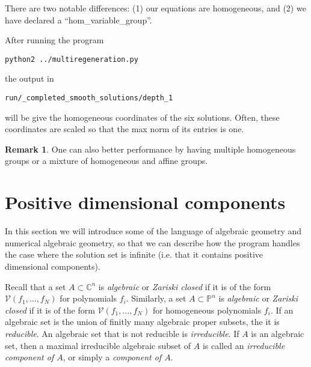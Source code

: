 \documentclass[12pt]{article}
\theoremstyle{definition}
\newtheorem{remark}{Remark}[section]
\newcommand{\C}{\mathbb{C}}
\newcommand{\PP}{\mathbb{P}}
\begin{document}
There are two notable differences: (1) our equations are homogeneous, and 
(2) we have declared a ``hom\_variable\_group''.

 After running the program
\begin{leftbar}
\vspace{-10pt} 
\begin{verbatim}
python2 ../multiregeneration.py
\end{verbatim}\vspace{-10pt} 
\end{leftbar}
\noindent the output in
\begin{leftbar}
\vspace{-10pt} 
\begin{verbatim}
run/_completed_smooth_solutions/depth_1
\end{verbatim}\vspace{-10pt} 
\end{leftbar}
\noindent will be give the homogeneous coordinates of the six 
solutions.
Often, these coordinates are scaled so that the max norm of its entries is one. 

\begin{remark}
One can also better performance by having multiple homogeneous groups or a mixture of homogeneous and affine groups. 
\end{remark}

\section{Positive dimensional components}
In this section we will introduce some of the language of 
algebraic geometry and numerical algebraic geometry, so that we can 
describe how the program handles the case where the solution set is 
infinite (i.e. that it contains positive dimensional components).

Recall that a set $A \subset \C^n$ is \emph{algebraic} or \emph{Zariski 
closed} if it is of the form $\mathcal{V}(f_1, \ldots, f_N)$ for 
polynomials $f_i$. Similarly, a set $A \subset \PP^n$ is 
\emph{algebraic} or \emph{Zariski closed} if it is of the form 
$\mathcal{V}(f_1, \ldots, f_N)$ for 
homogeneous polynomials $f_i$. If an algebraic set is the union of 
finitly many algebraic proper subsets, the it is \emph{reducible}. An 
algebraic set that is not reducible is \emph{irreducible}. If $A$ is an 
algebraic set, then a maximal irreducible algebraic subset of $A$ 
is called an \emph{irreducible component of $A$}, or simply a 
\emph{component of $A$}.
\end{document}
